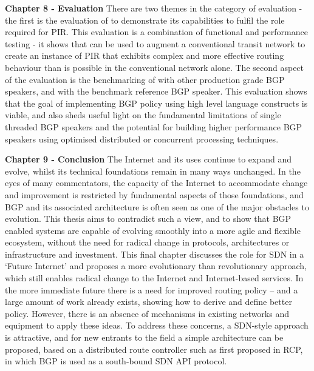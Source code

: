 \textbf{Chapter 8 - Evaluation}
There are two themes in the category of evaluation - the first is the evaluation of \hbgp to demonstrate its capabilities to fulfil the role required for PIR.
This evaluation is a combination of functional and performance testing - it shows that \hbgp can be used to augment a conventional transit network to create an instance of PIR that exhibits complex and more effective routing behaviour than is possible in the conventional network alone.
The second aspect of the evaluation is the benchmarking of \hbgp with other production grade BGP speakers, and with the benchmark reference BGP speaker.
This evaluation shows that the goal of implementing BGP policy using high level language constructs is viable, and also sheds useful light on the fundamental limitations of single threaded BGP speakers and the potential for building higher performance BGP speakers using optimised distributed or concurrent processing techniques.
\medskip

\textbf{Chapter 9 - Conclusion}
The Internet and its uses continue to expand and evolve, whilst its technical foundations remain in many ways unchanged.
In the eyes of many commentators, the capacity of the Internet to accommodate change and improvement is restricted by fundamental aspects of those foundations, and BGP and its associated architecture is often seen as one of the major obstacles to evolution.
This thesis aims to contradict such a view, and to show that BGP enabled systems are capable of evolving smoothly into a more agile and flexible ecosystem, without the need for radical change in protocols, architectures or infrastructure and investment.
This final chapter discusses the role for SDN in a `Future Internet’ and proposes a more evolutionary than revolutionary approach, which still enables radical change to the Internet and Internet-based services.
In the more immediate future there is a need for improved routing policy -- and a large amount of work already exists, showing how to derive and define better policy. However, there is an absence of mechanisms in existing networks and equipment to apply these ideas.
To address these concerns, a SDN-style approach is attractive, and for new entrants to the field a simple architecture can be proposed, based on a distributed route controller such as first proposed in RCP, in which BGP is used as a south-bound SDN API protocol.

